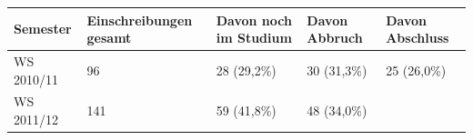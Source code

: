 \begin{longtable}[c]{@{}lllll@{}}
\toprule
\begin{minipage}[b]{0.13\columnwidth}\raggedright\strut
Semester
\strut\end{minipage} &
\begin{minipage}[b]{0.27\columnwidth}\raggedright\strut
Einschreibungen gesamt
\strut\end{minipage} &
\begin{minipage}[b]{0.26\columnwidth}\raggedright\strut
Davon noch im Studium
\strut\end{minipage} &
\begin{minipage}[b]{0.17\columnwidth}\raggedright\strut
Davon Abbruch
\strut\end{minipage} &
\begin{minipage}[b]{0.19\columnwidth}\raggedright\strut
Davon Abschluss
\strut\end{minipage}\tabularnewline
\midrule
\endhead
\begin{minipage}[t]{0.13\columnwidth}\raggedright\strut
WS 2010/11
\strut\end{minipage} &
\begin{minipage}[t]{0.27\columnwidth}\raggedright\strut
96
\strut\end{minipage} &
\begin{minipage}[t]{0.26\columnwidth}\raggedright\strut
28 (29,2\%)
\strut\end{minipage} &
\begin{minipage}[t]{0.17\columnwidth}\raggedright\strut
30 (31,3\%)
\strut\end{minipage} &
\begin{minipage}[t]{0.19\columnwidth}\raggedright\strut
25 (26,0\%)
\strut\end{minipage}\tabularnewline
\begin{minipage}[t]{0.13\columnwidth}\raggedright\strut
WS 2011/12
\strut\end{minipage} &
\begin{minipage}[t]{0.27\columnwidth}\raggedright\strut
141
\strut\end{minipage} &
\begin{minipage}[t]{0.26\columnwidth}\raggedright\strut
59 (41,8\%)
\strut\end{minipage} &
\begin{minipage}[t]{0.17\columnwidth}\raggedright\strut
48 (34,0\%)
\strut\end{minipage} &
\begin{minipage}[t]{0.19\columnwidth}\raggedright\strut

\end{minipage}
\end{longtable}
